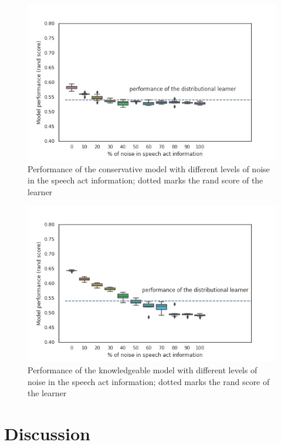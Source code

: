 \begin{figure}[H]
    \centering
    \includegraphics[width=1\textwidth]{figures/man-noisy-rand-cons}
    \caption{Performance of the conservative \plearnerabbr{} model with different levels of noise in the speech act information; dotted marks the rand score of the \dlearnerabbr{} learner}
    \label{fig:man-noisy-rand-cons}
\end{figure}

\begin{figure}[H]
    \centering
    \includegraphics[width=1\textwidth]{figures/man-noisy-rand-mid}
    \caption{Performance of the knowledgeable \plearnerabbr{} model with different levels of noise in the speech act information; dotted marks the rand score of the \dlearnerabbr{} learner}
    \label{fig:man-noisy-rand-mid}
\end{figure}


\section{Discussion}
\label{sec:mancl:discussion}

